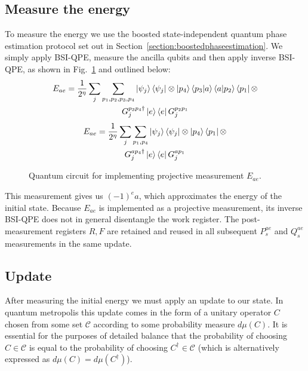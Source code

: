 \documentclass[aps,floatfix,10pt,amssymb,amsfont,amsmath,superscriptaddress,float,nofootinbib,longbibliography,nobalancelastpage,twocolumn]{revtex4-2}
\begin{document}
\subsection{Measure the energy}
\label{section:energymeasurement}
To measure the energy we use the boosted state-independent quantum phase estimation protocol set out in Section~\ref{section:boostedphaseestimation}. We simply apply BSI-QPE, measure the ancilla qubits and then apply inverse BSI-QPE, as shown in Fig.~\ref{fig:Ecircuit} and outlined below:
\begin{multline}
    E_{ae} = \frac{1}{2^{\eta}}\sum_j\sum_{p_1,p_2,p_3,p_4} \ket{\psi_j}\bra{\psi_j} \otimes \ket{p_4}\braket{p_3|a}\braket{a|p_2}\bra{p_1} \otimes \\G_j^{p_3p_4 \dagger}\ket{e}\bra{e}G_j^{p_2p_1}
\end{multline}
\begin{multline}
        E_{ae} = \frac{1}{2^{\eta}}\sum_j\sum_{p_1,p_4} \ket{\psi_j}\bra{\psi_j}\otimes\ket{p_4}\bra{p_1}\otimes\\
        G_j^{ap_4 \dagger}\ket{e}\bra{e}G_j^{ap_1}
\end{multline}
\begin{figure}

\caption{Quantum circuit for implementing projective measurement $E_{ae}$.}
\label{fig:Ecircuit}
\end{figure}
This measurement gives us $(-1)^ea$, which approximates the energy of the initial state. Because $E_{ae}$ is implemented as a projective measurement, its inverse BSI-QPE does not in general disentangle the work register. The post-measurement registers $R, F$ are retained and reused in all subsequent $P_s^{ae}$ and $Q_s^{ae}$ measurements in the same update.
\subsection{Update}
\label{section:update}
After measuring the initial energy we must apply an update to our state. In quantum metropolis this update comes in the form of a unitary operator $C$ chosen from some set $\mathcal{C}$ according to some probability measure $d\mu(C)$. It is essential for the purposes of detailed balance that the probability of choosing $C \in \mathcal{C}$ is equal to the probability of choosing $C^{\dagger} \in \mathcal{C}$ (which is alternatively expressed as $d\mu(C) = d\mu(C^{\dagger})$).
\end{document}
